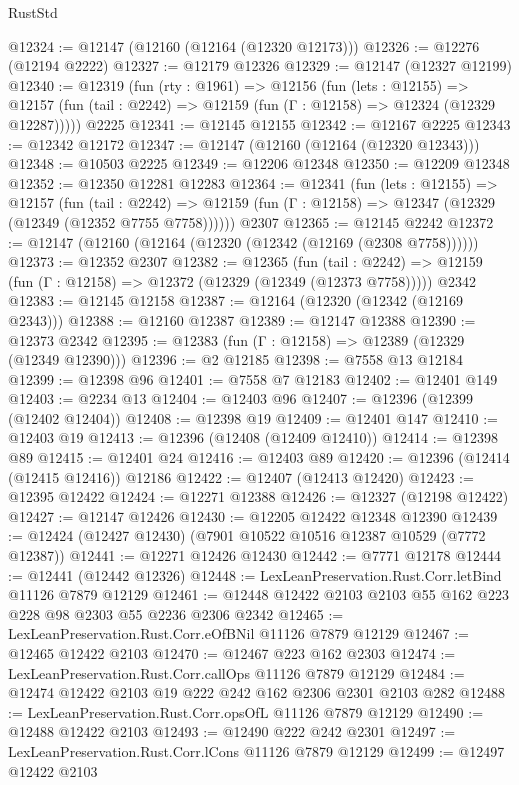 \begin{lexlean}{RustStd}
\begin{coremodule}
@12324 := @12147 (@12160 (@12164 (@12320 @12173)))
@12326 := @12276 (@12194 @2222)
@12327 := @12179 @12326
@12329 := @12147 (@12327 @12199)
@12340 := @12319
    (fun (rty : @1961) =>
    @12156
      (fun (lets : @12155) =>
      @12157 (fun (tail : @2242) => @12159 (fun (Γ : @12158) => @12324 (@12329 @12287)))))
    @2225
@12341 := @12145 @12155
@12342 := @12167 @2225
@12343 := @12342 @12172
@12347 := @12147 (@12160 (@12164 (@12320 @12343)))
@12348 := @10503 @2225
@12349 := @12206 @12348
@12350 := @12209 @12348
@12352 := @12350 @12281 @12283
@12364 := @12341
    (fun (lets : @12155) =>
    @12157
      (fun (tail : @2242) =>
      @12159 (fun (Γ : @12158) => @12347 (@12329 (@12349 (@12352 @7755 @7758))))))
    @2307
@12365 := @12145 @2242
@12372 := @12147 (@12160 (@12164 (@12320 (@12342 (@12169 (@2308 @7758))))))
@12373 := @12352 @2307
@12382 := @12365
    (fun (tail : @2242) => @12159 (fun (Γ : @12158) => @12372 (@12329 (@12349 (@12373 @7758)))))
    @2342
@12383 := @12145 @12158
@12387 := @12164 (@12320 (@12342 (@12169 @2343)))
@12388 := @12160 @12387
@12389 := @12147 @12388
@12390 := @12373 @2342
@12395 := @12383 (fun (Γ : @12158) => @12389 (@12329 (@12349 @12390)))
@12396 := @2 @12185
@12398 := @7558 @13 @12184
@12399 := @12398 @96
@12401 := @7558 @7 @12183
@12402 := @12401 @149
@12403 := @2234 @13
@12404 := @12403 @96
@12407 := @12396 (@12399 (@12402 @12404))
@12408 := @12398 @19
@12409 := @12401 @147
@12410 := @12403 @19
@12413 := @12396 (@12408 (@12409 @12410))
@12414 := @12398 @89
@12415 := @12401 @24
@12416 := @12403 @89
@12420 := @12396 (@12414 (@12415 @12416)) @12186
@12422 := @12407 (@12413 @12420)
@12423 := @12395 @12422
@12424 := @12271 @12388
@12426 := @12327 (@12198 @12422)
@12427 := @12147 @12426
@12430 := @12205 @12422 @12348 @12390
@12439 := @12424 (@12427 @12430) (@7901 @10522 @10516 @12387 @10529 (@7772 @12387))
@12441 := @12271 @12426 @12430
@12442 := @7771 @12178
@12444 := @12441 (@12442 @12326)
@12448 := LexLeanPreservation.Rust.Corr.letBind @11126 @7879 @12129
@12461 := @12448 @12422 @2103 @2103 @55 @162 @223 @228 @98 @2303 @55 @2236 @2306 @2342
@12465 := LexLeanPreservation.Rust.Corr.eOfBNil @11126 @7879 @12129
@12467 := @12465 @12422 @2103
@12470 := @12467 @223 @162 @2303
@12474 := LexLeanPreservation.Rust.Corr.callOps @11126 @7879 @12129
@12484 := @12474 @12422 @2103 @19 @222 @242 @162 @2306 @2301 @2103 @282
@12488 := LexLeanPreservation.Rust.Corr.opsOfL @11126 @7879 @12129
@12490 := @12488 @12422 @2103
@12493 := @12490 @222 @242 @2301
@12497 := LexLeanPreservation.Rust.Corr.lCons @11126 @7879 @12129
@12499 := @12497 @12422 @2103

\end{coremodule}
\end{lexlean}
